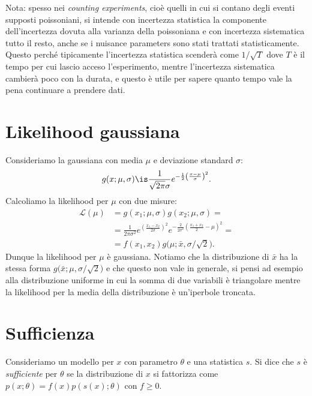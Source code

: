 Nota: spesso nei \emph{counting experiments},
cioè quelli in cui si contano degli eventi supposti poissoniani,
si intende con incertezza statistica la componente dell'incertezza dovuta alla varianza della poissoniana
e con incertezza sistematica tutto il resto,
anche se i nuisance parameters sono stati trattati statisticamente.
Questo perché tipicamente l'incertezza statistica scenderà come $1/\sqrt T$
dove $T$ è il tempo per cui lascio acceso l'esperimento,
mentre l'incertezza sistematica cambierà poco con la durata,
e questo è utile per sapere quanto tempo vale la pena continuare a prendere dati.

\section{Likelihood gaussiana}

Consideriamo la gaussiana con media $\mu$ e deviazione standard $\sigma$:
\begin{equation*}
	g(x;\mu,\sigma) \is \frac1{\sqrt{2\pi}\sigma} e^{-\frac12 \left( \frac{x-\mu}\sigma \right)^2}.
\end{equation*}
Calcoliamo la likelihood per $\mu$ con due misure:
\begin{align*}
	\mathcal L(\mu)
	&= g(x_1;\mu,\sigma) g(x_2;\mu,\sigma) = \\
	&= \frac1{2\pi\sigma^2}
	e^{\left( \frac{x_1-x_2}{2\sigma} \right)^2}
	e^{-\frac2{2\sigma^2} \left( \frac{x_1+x_2}2 - \mu \right)^2} = \\
	&= f(x_1,x_2) g \big( \mu;\bar x,\sigma/\sqrt2 \big).
\end{align*}
Dunque la likelihood per $\mu$ è gaussiana.
Notiamo che la distribuzione di $\bar x$ ha la stessa forma $g \big( \bar x;\mu,\sigma/\sqrt2 \big)$
e che questo non vale in generale, si pensi ad esempio alla distribuzione uniforme
in cui la somma di due variabili è triangolare mentre la likelihood per la media della distribuzione è un'iperbole troncata.

\section{Sufficienza}

\begin{definition}[Sufficienza]
	\label{th:suff}
	Consideriamo un modello per $x$ con parametro $\theta$ e una statistica $s$.
	Si dice che $s$ è \emph{sufficiente} per $\theta$ se la distribuzione di $x$ si fattorizza come
	$p(x;\theta) = f(x) p(s(x);\theta)$ con $f\ge0$.
\end{definition}

